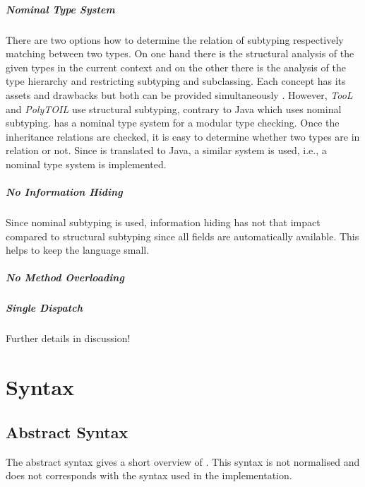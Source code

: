 \paragraph{Nominal Type System}
There are two options how to determine the relation of subtyping
respectively matching between two types. On one hand there is the structural
analysis of the given types in the current context and on the other there
is the analysis of the type hierarchy and restricting subtyping and
subclassing. Each concept has its assets and drawbacks but both can
be provided simultaneously \cite{malayeri_integrating_2008}. However,
\emph{TooL} and \emph{PolyTOIL} use structural subtyping, contrary to
Java which uses nominal subtyping. \ooplss has a nominal type system
for a modular type checking. Once the inheritance relations are checked,
it is easy to determine whether two types are in relation or not. Since
\ooplss is translated to Java, a similar system is used, i.e., a nominal
type system is implemented.

\paragraph{No Information Hiding}
Since nominal subtyping is used, information hiding has not that impact
compared to structural subtyping since all fields are automatically
available. This helps to keep the language small.

\paragraph{No Method Overloading}

\paragraph{Single Dispatch}

Further details in discussion!

\chapter{Syntax}
\section{Abstract Syntax}
The abstract syntax gives a short overview of \ooplss. This syntax is
not normalised and does not corresponds with the syntax used in the
implementation.

